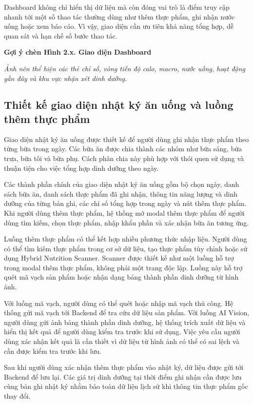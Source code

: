 \documentclass[12pt, a4paper]{report}
\begin{document}
Dashboard không chỉ hiển thị dữ liệu mà còn đóng vai trò là điểm truy cập nhanh tới một số thao tác thường dùng như thêm thực phẩm, ghi nhận nước uống hoặc xem báo cáo. Vì vậy, giao diện cần ưu tiên khả năng tổng hợp, dễ quan sát và hạn chế số bước thao tác.

\textbf{Gợi ý chèn Hình 2.x. Giao diện Dashboard}

\textit{Ảnh nên thể hiện các thẻ chỉ số, vòng tiến độ calo, macro, nước uống, hoạt động gần đây và khu vực nhận xét dinh dưỡng.}

\subsection{Thiết kế giao diện nhật ký ăn uống và luồng thêm thực phẩm}Giao diện nhật ký ăn uống được thiết kế để người dùng ghi nhận thực phẩm theo từng bữa trong ngày. Các bữa ăn được chia thành các nhóm như bữa sáng, bữa trưa, bữa tối và bữa phụ. Cách phân chia này phù hợp với thói quen sử dụng và thuận tiện cho việc tổng hợp dinh dưỡng theo ngày.

Các thành phần chính của giao diện nhật ký ăn uống gồm bộ chọn ngày, danh sách bữa ăn, danh sách thực phẩm đã ghi nhận, thông tin năng lượng và dinh dưỡng của từng bản ghi, các chỉ số tổng hợp trong ngày và nút thêm thực phẩm. Khi người dùng thêm thực phẩm, hệ thống mở modal thêm thực phẩm để người dùng tìm kiếm, chọn thực phẩm, nhập khẩu phần và xác nhận bữa ăn tương ứng.

Luồng thêm thực phẩm có thể kết hợp nhiều phương thức nhập liệu. Người dùng có thể tìm kiếm thực phẩm trong cơ sở dữ liệu, tạo thực phẩm tùy chỉnh hoặc sử dụng Hybrid Nutrition Scanner. Scanner được thiết kế như một luồng hỗ trợ trong modal thêm thực phẩm, không phải một trang độc lập. Luồng này hỗ trợ quét mã vạch sản phẩm hoặc nhận dạng bảng thành phần dinh dưỡng từ hình ảnh.

Với luồng mã vạch, người dùng có thể quét hoặc nhập mã vạch thủ công. Hệ thống gửi mã vạch tới Backend để tra cứu dữ liệu sản phẩm. Với luồng AI Vision, người dùng gửi ảnh bảng thành phần dinh dưỡng, hệ thống trích xuất dữ liệu và hiển thị kết quả để người dùng kiểm tra trước khi sử dụng. Việc yêu cầu người dùng xác nhận kết quả là cần thiết vì dữ liệu từ hình ảnh có thể có sai lệch và cần được kiểm tra trước khi lưu.

Sau khi người dùng xác nhận thêm thực phẩm vào nhật ký, dữ liệu được gửi tới Backend để lưu lại. Các giá trị dinh dưỡng tại thời điểm ghi nhận cần được lưu cùng bản ghi nhật ký nhằm bảo toàn dữ liệu lịch sử khi thông tin thực phẩm gốc thay đổi.
\end{document}
